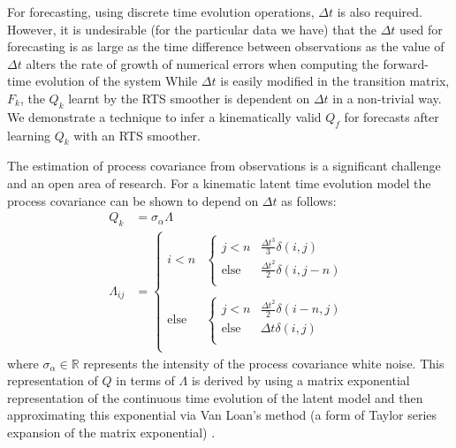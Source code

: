 \documentclass[pamm,a4paper,fleqn]{w-art}
\begin{document}
For forecasting, using discrete time evolution operations, $\Delta t$ is also required. However, it is undesirable (for the particular data we have) that the $\Delta t$ used for forecasting is as large as the time difference between observations as the value of $\Delta t$ alters the rate of growth of numerical errors when computing the forward-time evolution of the system While $\Delta t$ is easily modified in the transition matrix, $F_k$, the $Q_k$ learnt by the RTS smoother is dependent on $\Delta t$ in a non-trivial way. We demonstrate a technique to infer a kinematically valid $Q_f$ for forecasts after learning $Q_k$ with an RTS smoother.

The estimation of process covariance from observations is a significant challenge and an open area of research. For a kinematic latent time evolution model the process covariance can be shown to depend on $\Delta t$ \cite{chen2021time,sarkka2013bayesian} as follows:
\begin{align}
  Q_k &= \sigma_\alpha \Lambda \\
  \Lambda_{ij} &= 
  \begin{cases}
    i < n & \begin{cases}
      j < n & \frac{\Delta t^3}{3}\delta(i,j) \\
      \text{else} & \frac{\Delta t^2}{2}\delta(i,j-n) \\
    \end{cases} \\
    \\
    \text{else} &  
    \begin{cases}
        j < n & \frac{\Delta t^2}{2}\delta(i-n,j) \\
        \text{else} & \Delta t\delta(i,j) \\
      \end{cases} \\
  \end{cases}
\end{align}
where $\sigma_\alpha \in \mathbb{R}$ represents the intensity of the process covariance white noise. This representation of $Q$ in terms of $\Lambda$ is derived by using a matrix exponential representation of the continuous time evolution of the latent model and then approximating this exponential via Van Loan's method (a form of Taylor series expansion of the matrix exponential) \cite{horn2012matrix}.
\end{document}
